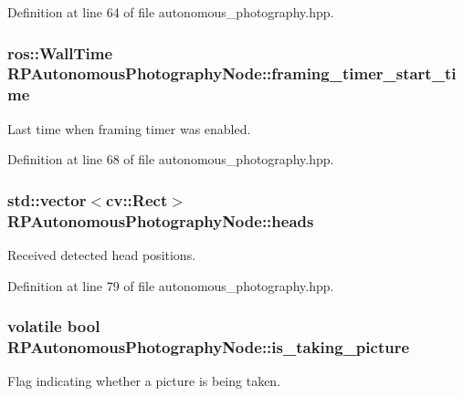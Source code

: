 \-Definition at line 64 of file autonomous\-\_\-photography.\-hpp.

\hypertarget{class_r_p_autonomous_photography_node_ae8ce7f1f61fbbcbfd1d92eeccfe8c214}{
\subsubsection[{framing\-\_\-timer\-\_\-start\-\_\-time}]{\setlength{\rightskip}{0pt plus 5cm}ros\-::\-Wall\-Time {\bf \-R\-P\-Autonomous\-Photography\-Node\-::framing\-\_\-timer\-\_\-start\-\_\-time}}}\label{class_r_p_autonomous_photography_node_ae8ce7f1f61fbbcbfd1d92eeccfe8c214}
\-Last time when framing timer was enabled. 

\-Definition at line 68 of file autonomous\-\_\-photography.\-hpp.

\hypertarget{class_r_p_autonomous_photography_node_a88f3a832bd13409ec9165aeffa502f16}{
\subsubsection[{heads}]{\setlength{\rightskip}{0pt plus 5cm}std\-::vector$<$cv\-::\-Rect$>$ {\bf \-R\-P\-Autonomous\-Photography\-Node\-::heads}}}\label{class_r_p_autonomous_photography_node_a88f3a832bd13409ec9165aeffa502f16}
\-Received detected head positions. 

\-Definition at line 79 of file autonomous\-\_\-photography.\-hpp.

\hypertarget{class_r_p_autonomous_photography_node_afc90599505fdcb085495d06d7edbd293}{
\subsubsection[{is\-\_\-taking\-\_\-picture}]{\setlength{\rightskip}{0pt plus 5cm}volatile bool {\bf \-R\-P\-Autonomous\-Photography\-Node\-::is\-\_\-taking\-\_\-picture}}}\label{class_r_p_autonomous_photography_node_afc90599505fdcb085495d06d7edbd293}
\-Flag indicating whether a picture is being taken. 

